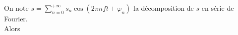 \documentclass[a4paper]{article}
\begin{document}
\pagestyle{fancy}
\fancyhf{}
\setlength{\headheight}{15pt}

\begin{center}
	\large{}
\end{center}


On note \(s=\sum\limits_{n=0}^{+\infty}s_n \cos(2\pi nft +\varphi_n)\) la décomposition de \(s\) en série de Fourier.\\
Alors
\begin{center}
\end{center}
\end{document}
